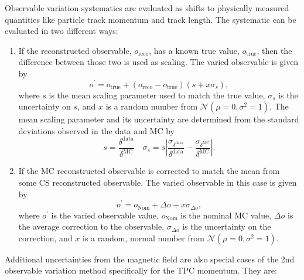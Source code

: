 Observable variation systematics are evaluated as shifts to physically
measured quantities like particle track momentum and track length.
The systematic can be evaluated in two different ways:
\begin{enumerate}
\item If the reconstructed observable, $o_{\text{reco}}$, has a known true
value, $o_{\text{true}}$, then the difference between those two is
used as scaling. The varied observable is given by
\begin{equation}
o^{\prime}=o_{\text{true}}+\left(o_{\text{reco}}-o_{\text{true}}\right)\left(s+x\sigma_{s}\right),\label{eq:recotrueobsvar}
\end{equation}
where $s$ is the mean scaling parameter used to match the true value,
$\sigma_{s}$ is the uncertainty on $s$, and $x$ is a random number
from $\mathcal{N}\left(\mu=0,\sigma^{2}=1\right)$. The mean scaling
parameter and its uncertainty are determined from the standard deviations
observed in the data and MC by
\begin{equation}
s=\frac{\delta^{\text{data}}}{\delta^{\text{MC}}}\quad\sigma_{s}=s\left|\frac{\sigma_{\delta^{\text{data}}}}{\delta^{\text{data}}}-\frac{\sigma_{\delta^{\text{MC}}}}{\delta^{\text{MC}}}\right|.\label{eq:scalingdefrecotrueobsvar}
\end{equation}
\item If the MC reconstructed observable is corrected to match the mean
from some CS reconstructed observable. The varied observable in this
case is given by
\begin{equation}
o^{\prime}=o_{\text{Nom}}+\Delta o+x\sigma_{\Delta o},\label{eq:obsvariation}
\end{equation}
where $o^{\prime}$ is the varied observable value, $o_{\text{Nom}}$
is the nominal MC value, $\Delta o$ is the average correction to
the observable, $\sigma_{\Delta o}$ is the uncertainty on the correction,
and $x$ is a random, normal number from $\mathcal{N}\left(\mu=0,\sigma^{2}=1\right)$.
\end{enumerate}
Additional uncertainties from the magnetic field are also special
cases of the 2nd observable variation method specifically for the
TPC momentum\cite{Wret2019}. They are:
